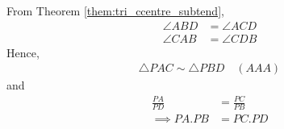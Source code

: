 %
\solution From Theorem \ref{them:tri_ccentre_subtend}, 
	\begin{equation}
	\begin{split}
\angle ABD &= \angle ACD \\
\angle CAB &= \angle CDB	
	\end{split}
	\end{equation}
Hence, 
%
\begin{align}
\triangle PAC \sim \triangle  PBD \quad (AAA)
\end{align}
%
and
%
\begin{align}
\frac{PA}{PD} &= \frac{PC}{PB} \\
\implies PA.PB &= PC.PD
\end{align}
%
%
%		
%

